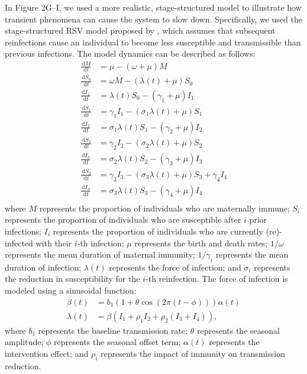 \documentclass[12pt]{article}
\newcommand{\dd}[1]{\ensuremath{\, \mathrm{d}#1}}
\begin{document}
In Figure 2G--I, we used a more realistic, stage-structured model to illustrate how transient phenomena can cause the system to slow down.
Specifically, we used the stage-structured RSV model proposed by \citep{pitzer2015environmental}, which assumes that subsequent reinfections cause an individual to become less susceptible and transmissible than previous infections.
The model dynamics can be described as follows:
\begin{align}
\frac{\dd M}{\dd t} &= \mu - (\omega + \mu) M\\
\frac{\dd S_0}{\dd t} &= \omega M - (\lambda(t) + \mu) S_0\\
\frac{\dd I_1}{\dd t} &= \lambda(t) S_0 - (\gamma_1 + \mu) I_1\\
\frac{\dd S_1}{\dd t} &= \gamma_1 I_1 - (\sigma_1 \lambda(t) + \mu) S_1\\
\frac{\dd I_2}{\dd t} &= \sigma_1 \lambda(t) S_1 - (\gamma_2 + \mu) I_2\\
\frac{\dd S_2}{\dd t} &= \gamma_2 I_2 - (\sigma_2 \lambda(t) + \mu) S_2\\
\frac{\dd I_3}{\dd t} &= \sigma_2 \lambda(t) S_2 - (\gamma_3 + \mu) I_3\\
\frac{\dd S_3}{\dd t} &= \gamma_3 I_3 - (\sigma_3 \lambda(t) + \mu) S_3 + \gamma_4 I_4\\
\frac{\dd I_4}{\dd t} &= \sigma_3 \lambda(t) S_3 - (\gamma_4 + \mu) I_4\\
\end{align}
where $M$ represents the proportion of individuals who are maternally immune;
$S_i$ represents the proportion of individuals who are susceptible after $i$ prior infections;
$I_i$ represents the proportion of individuals who are currently (re)-infected with their $i$-th infection;
$\mu$ represents the birth and death rates;
$1/\omega$ represents the mean duration of maternal immunity;
$1/\gamma_i$ represents the mean duration of infection;
$\lambda(t)$ represents the force of infection;
and $\sigma_i$ represents the reduction in susceptibility for the $i$-th reinfection.
The force of infection is modeled using a sinusoidal function:
\begin{align}
\beta(t) &= b_1 (1 + \theta \cos(2 \pi (t-\phi))) \alpha(t)\\
\lambda(t) &= \beta (I_1 + \rho_1 I_2 + \rho_2 (I_3 + I_4)), 
\end{align}
where $b_1$ represents the baseline transmission rate; $\theta$ represents the seasonal amplitude; $\phi$ represents the seasonal offset term; $\alpha(t)$ represents the intervention effect; and $\rho_i$ represents the impact of immunity on transmission reduction.
\end{document}
